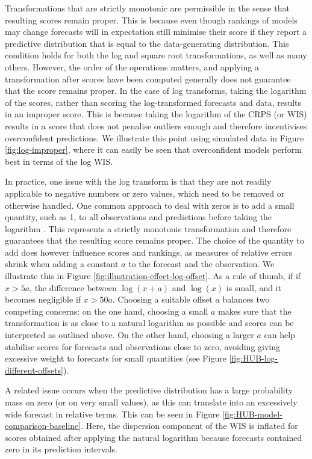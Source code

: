 \documentclass{article}
\begin{document}
Transformations that are strictly monotonic are permissible in the sense that resulting scores remain proper. This is because even though rankings of models may change forecasts will in expectation still minimise their score if they report a predictive distribution that is equal to the data-generating distribution. This condition holds for both the log and square root transformations, as well as many others. However, the order of the operations matters, and applying a transformation after scores have been computed generally does not guarantee that the score remains proper. In the case of log transforms, taking the logarithm of the scores, rather than scoring the log-transformed forecasts and data, results in an improper score. This is because taking the logarithm of the CRPS (or WIS) results in a score that does not penalise outliers enough and therefore incentivises overconfident predictions. We illustrate this point using simulated data in Figure \ref{fig:log-improper}, where it can easily be seen that overconfident models perform best in terms of the log WIS. 

In practice, one issue with the log transform is that they are not readily applicable to negative numbers or zero values, which need to be removed or otherwise handled. 
One common approach to deal with zeros is to add a small quantity, such as 1, to all observations and predictions before taking the logarithm \citep{bellegoDealingLogsZeros2022}. This represents a strictly monotonic transformation and therefore guarantees that the resulting score remains proper. The choice of the quantity to add does however influence scores and rankings, as measures of relative errors shrink when adding a constant $a$ to the forecast and the observation. We illustrate this in Figure \ref{fig:illustration-effect-log-offset}. As a rule of thumb, if if $x > 5a$, the difference between $\log{(x + a)}$ and $\log{(x)}$ is small, and it becomes negligible if $x > 50a$. Choosing a suitable offset $a$ balances two competing concerns: on the one hand, choosing a small $a$ makes sure that the transformation is as close to a natural logarithm as possible and scores can be interpreted as outlined above. On the other hand, choosing a larger $a$ can help stabilise scores for forecasts and observations close to zero, avoiding giving excessive weight to forecasts for small quantities (see Figure \ref{fig:HUB-log-different-offsets}). 

A related issue occurs when the predictive distribution has a large probability mass on zero (or on very small values), as this can translate into an excessively wide forecast in relative terms. This can be seen in Figure \ref{fig:HUB-model-comparison-baseline}. Here, the dispersion component of the WIS is inflated for scores obtained after applying the natural logarithm because forecasts contained zero in its prediction intervals. 
\end{document}
